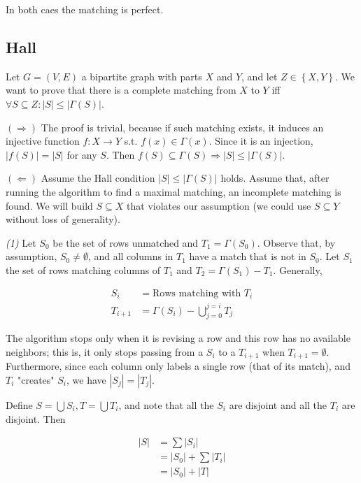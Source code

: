 \documentclass[a4paper, 12pt]{article}
\begin{document}
In both caes the matching is perfect.



\pagebreak 

\subsection{Hall}

Let $G = (V, E)$ a bipartite graph with parts $X$ and $Y$, and let $Z \in
\left\{ X, Y \right\} $. We want to prove that there is a complete matching
from $X$ to $Y$ iff $\forall S \subseteq Z : |S| \leq |\Gamma(S)| $.

$(\Rightarrow)$ The proof is trivial, because if such matching exists, it
induces an injective function $f : X \to Y$ s.t. $f(x) \in \Gamma(x)$. Since it
is an injection, $|f(S)| = |S|$ for any $S$. Then $f(S) \subseteq \Gamma(S)
\Rightarrow |S| \leq |\Gamma(S)|$.

$(\Leftarrow)$ Assume the Hall condition $|S| \leq |\Gamma(S)|$ holds. Assume
that, after running the algorithm to find a maximal matching, an incomplete
matching is found. We will build $S \subseteq X$ that violates our assumption
(we could use $S \subseteq Y$ without loss of generality).

\textit{(1)} Let $S_0$ be the set of rows unmatched and $T_1 = \Gamma(S_0)$.
Observe that, by assumption, $S_0 \neq \emptyset$, and all columns in $T_1$
have a match that is not in $S_0$. Let $S_1$ the set of rows matching columns
of $T_1$ and $T_2 = \Gamma(S_1) - T_1$. Generally, 

\begin{align*}
    S_i &= \text{Rows matching with } T_i \\ 
    T_{i+1} &= \Gamma(S_i) - \bigcup^{j=i}_{j=0} T_j
\end{align*}

The algorithm stops only when it is revising a row and this row has no
available neighbors; this is, it only stops passing from a $S_i$ to a $T_{i+1}$
when $T_{i+1} = \emptyset$. Furthermore, since each column only labels a single
row (that of its match), and $T_i$ "creates" $S_i$, we have $|S_j| = |T_j|$. 

Define $S = \bigcup S_i, T = \bigcup T_i$, and note that all the $S_i$ are
disjoint and all the $T_i$ are disjoint. Then

\begin{align*}
    |S| &= \sum |S_i| \\ 
        &= |S_0| + \sum |T_i| \\ 
        &= |S_0| + |T|
\end{align*}
\end{document}
